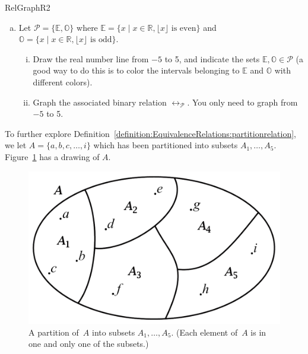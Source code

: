 \begin{exercise}{RelGraphR2}
\begin{enumerate}[(a)]
\item Let $\mathcal{P}=\{\mathbb{E},\mathbb{O}\}$ where $\mathbb{E}=\{x \mid x \in \mathbb{R}, \lfloor x \rfloor \text{ is even}\}$ and $\mathbb{O}=\{x \mid x \in \mathbb{R}, \lfloor x \rfloor \text{ is odd}\}$.
\begin{enumerate}[(i)]
\item Draw the real number line from $-5$ to 5, and indicate the sets $\mathbb{E},\mathbb{O}  \in \mathcal{P}$  (a good way to do this is to color the intervals belonging to 
$\mathbb{E}$ and $\mathbb{O}$ with different colors).
\item Graph the associated binary relation $\rel_\mathcal{P}$. You only need to graph from $-5$ to 5.
\end{enumerate}
\end{enumerate}
\end{exercise}

To further explore Definition~\ref{definition:EquivalenceRelations:partitionrelation}, we let $A=\{a,b,c,\ldots,i\}$ which has been partitioned into subsets $A_1, \ldots, A_5$. Figure~\ref{fig:partition_discrete} has a drawing of $A$.

\begin{figure}[htbp]
\begin{center}
\includegraphics[scale=0.35]{images/partition_discrete.png}
\caption{A partition of~$A$ into subsets $A_1, \ldots, A_5$. 
(Each element of~$A$ is in one and only one of the subsets.)}\label{fig:partition_discrete}
\end{center}
\end{figure}

